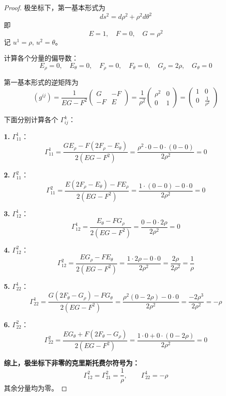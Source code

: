 \documentclass[lang=cn,10pt,thmcnt=section]{elegantbook}
\begin{document}
\begin{proof}
	极坐标下，第一基本形式为
	\[
	ds^2 = d\rho^2 + \rho^2 d\theta^2
	\]
	即
	\[
	E = 1, \quad F = 0, \quad G = \rho^2
	\]
	记 $u^1 = \rho,\, u^2 = \theta$。
	
	计算各个分量的偏导数：
	\[
	E_\rho = 0,\quad E_\theta = 0,\quad F_\rho = 0,\quad F_\theta = 0,\quad G_\rho = 2\rho,\quad G_\theta = 0
	\]
	
	第一基本形式的逆矩阵为
	\[
	(g^{ij}) = \frac{1}{EG - F^2}
	\begin{pmatrix}
	G & -F \\
	-F & E
	\end{pmatrix}
	= \frac{1}{\rho^2}
	\begin{pmatrix}
	\rho^2 & 0 \\
	0 & 1
	\end{pmatrix}
	= \begin{pmatrix}
	1 & 0 \\
	0 & \frac{1}{\rho^2}
	\end{pmatrix}
	\]
	
	下面分别计算各个 $\Gamma_{ij}^k$：
	
	\textbf{1.} $\Gamma_{11}^1$：
	\[
	\Gamma_{11}^1 = \frac{G E_\rho - F (2F_\rho - E_\theta)}{2(EG - F^2)} = \frac{\rho^2 \cdot 0 - 0 \cdot (0 - 0)}{2\rho^2} = 0
	\]
	
	\textbf{2.} $\Gamma_{11}^2$：
	\[
	\Gamma_{11}^2 = \frac{E(2F_\rho - E_\theta) - F E_\rho}{2(EG - F^2)} = \frac{1 \cdot (0 - 0) - 0 \cdot 0}{2\rho^2} = 0
	\]
	
	\textbf{3.} $\Gamma_{12}^1$：
	\[
	\Gamma_{12}^1 = \frac{E_\theta - F G_\rho}{2(EG - F^2)} = \frac{0 - 0 \cdot 2\rho}{2\rho^2} = 0
	\]
	
	\textbf{4.} $\Gamma_{12}^2$：
	\[
	\Gamma_{12}^2 = \frac{E G_\rho - F E_\theta}{2(EG - F^2)} = \frac{1 \cdot 2\rho - 0 \cdot 0}{2\rho^2} = \frac{2\rho}{2\rho^2} = \frac{1}{\rho}
	\]
	
	\textbf{5.} $\Gamma_{22}^1$：
	\[
	\Gamma_{22}^1 = \frac{G(2F_\theta - G_\rho) - F G_\theta}{2(EG - F^2)} = \frac{\rho^2 (0 - 2\rho) - 0 \cdot 0}{2\rho^2} = \frac{-2\rho^3}{2\rho^2} = -\rho
	\]
	
	\textbf{6.} $\Gamma_{22}^2$：
	\[
	\Gamma_{22}^2 = \frac{E G_\theta + F(2F_\theta - G_\rho)}{2(EG - F^2)} = \frac{1 \cdot 0 + 0 \cdot (0 - 2\rho)}{2\rho^2} = 0
	\]
	
	\textbf{综上，极坐标下非零的克里斯托费尔符号为：}
	\[
	\boxed{
	\Gamma_{12}^2 = \Gamma_{21}^2 = \frac{1}{\rho}, \qquad
	\Gamma_{22}^1 = -\rho
	}
	\]
	其余分量均为零。
\end{proof}
\end{document}
